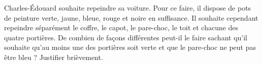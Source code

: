 \begin{exercice}\label{exoJanvier007}

Charles-Édouard souhaite repeindre sa voiture. Pour ce faire, il dispose de pots de peinture verte, jaune, bleue, rouge et noire en suffisance. Il souhaite cependant repeindre séparément le coffre, le capot, le pare-choc, le toit et chacune des quatre portières. De combien de façons différentes peut-il le faire sachant qu'il souhaite qu'au moins une des portières soit verte et que le pare-choc ne peut pas être bleu ? Justifier brièvement.

\end{exercice}
